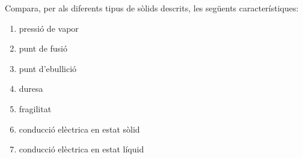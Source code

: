 \begin{exr}
Compara, per als diferents tipus de sòlids descrits, les següents característiques:
\begin{enumerate}
\item pressió de vapor
\item punt de fusió
\item punt d'ebullició
\item duresa
\item fragilitat
\item conducció elèctrica en estat sòlid
\item conducció elèctrica en estat líquid
\end{enumerate}
\end{exr}